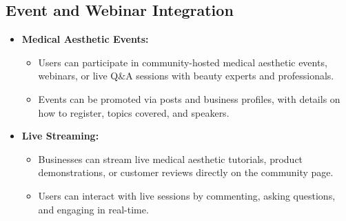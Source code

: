 \subsection{Event and Webinar Integration}
\begin{itemize}
    \item \textbf{Medical Aesthetic Events:}
    \begin{itemize}
        \item Users can participate in community-hosted medical aesthetic events, webinars, or live Q\&A sessions with beauty experts and professionals.
        \item Events can be promoted via posts and business profiles, with details on how to register, topics covered, and speakers.
    \end{itemize}
    
    \item \textbf{Live Streaming:}
    \begin{itemize}
        \item Businesses can stream live medical aesthetic tutorials, product demonstrations, or customer reviews directly on the community page.
        \item Users can interact with live sessions by commenting, asking questions, and engaging in real-time.
    \end{itemize}
\end{itemize}

